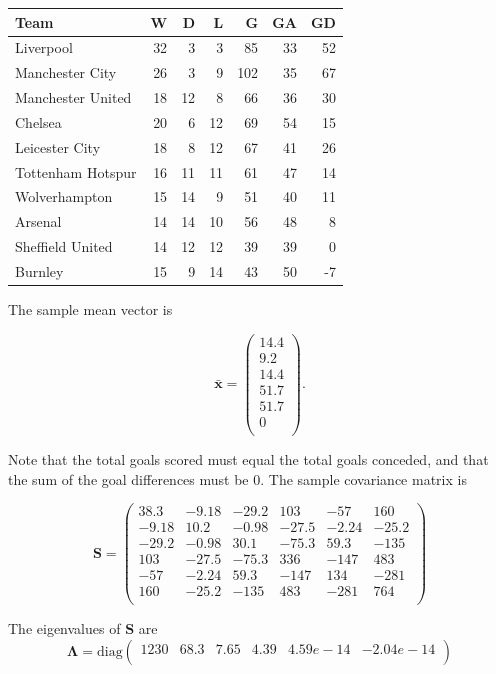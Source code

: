 \documentclass[
]{book}
\theoremstyle{definition}
\theoremstyle{definition}
\theoremstyle{definition}
\theoremstyle{definition}
\theoremstyle{remark}
\begin{document}
\begin{tabular}{lrrrrrr}
\toprule
Team & W & D & L & G & GA & GD\\
\midrule
Liverpool & 32 & 3 & 3 & 85 & 33 & 52\\
Manchester City & 26 & 3 & 9 & 102 & 35 & 67\\
Manchester United & 18 & 12 & 8 & 66 & 36 & 30\\
Chelsea & 20 & 6 & 12 & 69 & 54 & 15\\
Leicester City & 18 & 8 & 12 & 67 & 41 & 26\\
\addlinespace
Tottenham Hotspur & 16 & 11 & 11 & 61 & 47 & 14\\
Wolverhampton & 15 & 14 & 9 & 51 & 40 & 11\\
Arsenal & 14 & 14 & 10 & 56 & 48 & 8\\
Sheffield United & 14 & 12 & 12 & 39 & 39 & 0\\
Burnley & 15 & 9 & 14 & 43 & 50 & -7\\
\bottomrule
\end{tabular}

The sample mean vector is

\[\bar{\mathbf x} =\begin{pmatrix}14.4 \\9.2 \\14.4 \\51.7 \\51.7 \\0 \\\end{pmatrix}.\]

Note that the total goals scored must equal the total goals conceded, and that the sum of the goal differences must be \(0\). The sample covariance matrix is

\begin{equation}
\mathbf S= \begin{pmatrix}38.3&-9.18&-29.2&103&-57&160 \\-9.18&10.2&-0.98&-27.5&-2.24&-25.2 \\-29.2&-0.98&30.1&-75.3&59.3&-135 \\103&-27.5&-75.3&336&-147&483 \\-57&-2.24&59.3&-147&134&-281 \\160&-25.2&-135&483&-281&764 \\\end{pmatrix}
\label{eq:PLES}
\end{equation}

The eigenvalues of \(\mathbf S\) are
\[\boldsymbol \Lambda= \text{diag}\begin{pmatrix}1230&68.3&7.65&4.39&4.59e-14&-2.04e-14 \\\end{pmatrix}\]
\end{document}
